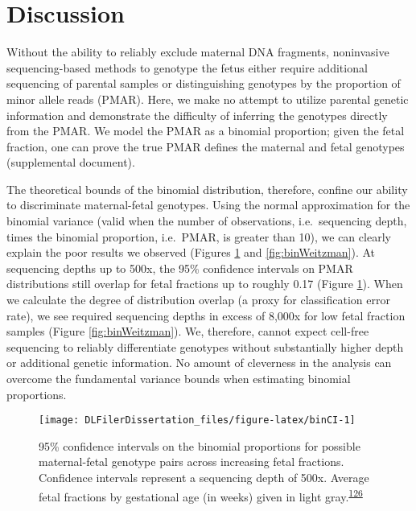 \documentclass[11pt,letterpaper]{book}
\begin{document}
\hypertarget{discussion-1}{%
\section{Discussion}\label{discussion-1}}

Without the ability to reliably exclude maternal DNA fragments, noninvasive sequencing-based methods to genotype the fetus either require additional sequencing of parental samples or distinguishing genotypes by the proportion of minor allele reads (PMAR).
Here, we make no attempt to utilize parental genetic information and demonstrate the difficulty of inferring the genotypes directly from the PMAR.
We model the PMAR as a binomial proportion; given the fetal fraction, one can prove the true PMAR defines the maternal and fetal genotypes (supplemental document).

The theoretical bounds of the binomial distribution, therefore, confine our ability to discriminate maternal-fetal genotypes.
Using the normal approximation for the binomial variance (valid when the number of observations, i.e.~sequencing depth, times the binomial proportion, i.e.~PMAR, is greater than 10), we can clearly explain the poor results we observed (Figures \ref{fig:binCI} and \ref{fig:binWeitzman}).
At sequencing depths up to 500x, the 95\% confidence intervals on PMAR distributions still overlap for fetal fractions up to roughly 0.17 (Figure \ref{fig:binCI}).
When we calculate the degree of distribution overlap (a proxy for classification error rate), we see required sequencing depths in excess of 8,000x for low fetal fraction samples (Figure \ref{fig:binWeitzman}).
We, therefore, cannot expect cell-free sequencing to reliably differentiate genotypes without substantially higher depth or additional genetic information.
No amount of cleverness in the analysis can overcome the fundamental variance bounds when estimating binomial proportions.





\begin{figure}

{\centering \texttt{[image: DLFilerDissertation\_files/figure-latex/binCI-1]} 

}

\caption[95\% confidence intervals on the binomial proportions for possible maternal-fetal genotype pairs.]{95\% confidence intervals on the binomial proportions for possible maternal-fetal genotype pairs across increasing fetal fractions. Confidence intervals represent a sequencing depth of 500x. Average fetal fractions by gestational age (in weeks) given in light gray.\textsuperscript{\protect\hyperlink{ref-kinnings:2015aa}{126}}}\label{fig:binCI}
\end{figure}
\end{document}
